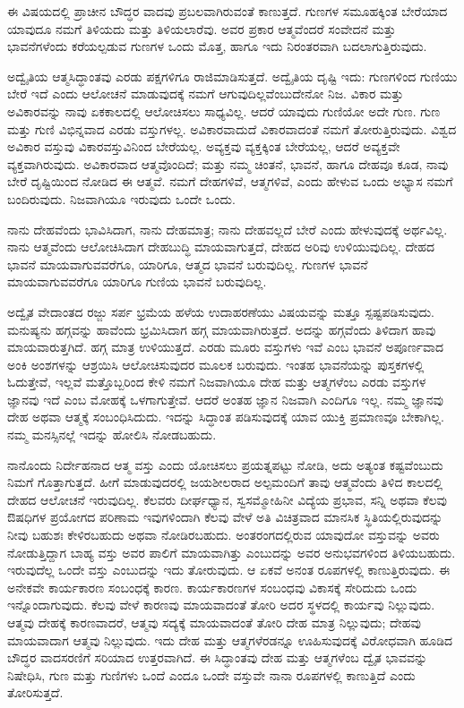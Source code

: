 ಈ ವಿಷಯದಲ್ಲಿ ಪ್ರಾಚೀನ ಬೌದ್ಧರ ವಾದವು ಪ್ರಬಲವಾಗಿರುವಂತೆ ಕಾಣುತ್ತದೆ. ಗುಣಗಳ ಸಮೂಹಕ್ಕಿಂತ ಬೇರೆಯಾದ ಯಾವುದೂ ನಮಗೆ ತಿಳಿಯದು ಮತ್ತು ತಿಳಿಯಲಾರೆವು. ಅವರ ಪ್ರಕಾರ ಆತ್ಮವೆಂದರೆ ಸಂವೇದನೆ ಮತ್ತು ಭಾವನೆಗಳೆಂದು ಕರೆಯಲ್ಪಡುವ ಗುಣಗಳ ಒಂದು ಮೊತ್ತ, ಹಾಗೂ ಇದು ನಿರಂತರವಾಗಿ ಬದಲಾಗುತ್ತಿರುವುದು. 

ಅದ್ವೈತಿಯ ಆತ್ಮಸಿದ್ಧಾಂತವು ಎರಡು ಪಕ್ಷಗಳಿಗೂ ರಾಜಿಮಾಡಿಸುತ್ತದೆ. ಅದ್ವೈತಿಯ ದೃಷ್ಟಿ ಇದು: ಗುಣಗಳಿಂದ ಗುಣಿಯು ಬೇರೆ ಇದೆ ಎಂದು ಆಲೋಚನೆ ಮಾಡುವುದಕ್ಕೆ ನಮಗೆ ಆಗುವುದಿಲ್ಲವೆಂಬುದೇನೋ ನಿಜ. ವಿಕಾರ ಮತ್ತು ಅವಿಕಾರವನ್ನು ನಾವು ಏಕಕಾಲದಲ್ಲಿ ಆಲೋಚಿಸಲು ಸಾಧ್ಯವಿಲ್ಲ. ಆದರೆ ಯಾವುದು ಗುಣಿಯೋ ಅದೇ ಗುಣ. ಗುಣ ಮತ್ತು ಗುಣಿ ವಿಭಿನ್ನವಾದ ಎರಡು ವಸ್ತುಗಳಲ್ಲ. ಅವಿಕಾರವಾದುದೆ ವಿಕಾರವಾದಂತೆ ನಮಗೆ ತೋರುತ್ತಿರುವುದು. ವಿಶ್ವದ ಅವಿಕಾರ ವಸ್ತುವು ವಿಕಾರವಸ್ತುವಿನಿಂದ ಬೇರೆಯಲ್ಲ. ಅವ್ಯಕ್ತವು ವ್ಯಕ್ತಕ್ಕಿಂತ ಬೇರೆಯಲ್ಲ, ಆದರೆ ಅವ್ಯಕ್ತವೇ ವ್ಯಕ್ತವಾಗಿರುವುದು. ಅವಿಕಾರವಾದ ಆತ್ಮವೊಂದಿದೆ; ಮತ್ತು ನಮ್ಮ ಚಿಂತನೆ, ಭಾವನೆ, ಹಾಗೂ ದೇಹವೂ ಕೂಡ, ನಾವು ಬೇರೆ ದೃಷ್ಟಿಯಿಂದ ನೋಡಿದ ಈ ಆತ್ಮವೆ. ನಮಗೆ ದೇಹಗಳಿವೆ, ಆತ್ಮಗಳಿವೆ, ಎಂದು ಹೇಳುವ ಒಂದು ಅಭ್ಯಾಸ ನಮಗೆ ಬಂದಿರುವುದು. ನಿಜವಾಗಿಯೂ ಇರುವುದು ಒಂದೇ ಒಂದು. 

ನಾನು ದೇಹವೆಂದು ಭಾವಿಸಿದಾಗ, ನಾನು ದೇಹಮಾತ್ರ; ನಾನು ದೇಹವಲ್ಲದೆ ಬೇರೆ ಎಂದು ಹೇಳುವುದಕ್ಕೆ ಅರ್ಥವಿಲ್ಲ. ನಾನು ಆತ್ಮವೆಂದು ಆಲೋಚಿಸಿದಾಗ ದೇಹಬುದ್ಧಿ ಮಾಯವಾಗುತ್ತದೆ, ದೇಹದ ಅರಿವು ಉಳಿಯುವುದಿಲ್ಲ. ದೇಹದ ಭಾವನೆ ಮಾಯವಾಗುವವರೆಗೂ, ಯಾರಿಗೂ, ಆತ್ಮದ ಭಾವನೆ ಬರುವುದಿಲ್ಲ. ಗುಣಗಳ ಭಾವನೆ ಮಾಯವಾಗುವವರೆಗೂ ಯಾರಿಗೂ ಗುಣಿಯ ಭಾವನೆ ಬರುವುದಿಲ್ಲ. 

ಅದ್ವೈತ ವೇದಾಂತದ ರಜ್ಜು ಸರ್ಪ ಭ್ರಮೆಯ ಹಳೆಯ ಉದಾಹರಣೆಯು ವಿಷಯವನ್ನು ಮತ್ತೂ ಸ್ಪಷ್ಟಪಡಿಸುವುದು. ಮನುಷ್ಯನು ಹಗ್ಗವನ್ನು ಹಾವೆಂದು ಭ್ರಮಿಸಿದಾಗ ಹಗ್ಗ ಮಾಯವಾಗಿರುತ್ತದೆ. ಅದನ್ನು ಹಗ್ಗವೆಂದು ತಿಳಿದಾಗ ಹಾವು ಮಾಯವಾರುತ್ತಗಿದೆ. ಹಗ್ಗ ಮಾತ್ರ ಉಳಿಯುತ್ತದೆ. ಎರಡು ಮೂರು ವಸ್ತುಗಳು ಇವೆ ಎಂಬ ಭಾವನೆ ಅಪೂರ್ಣವಾದ ಅಂಕಿ ಅಂಶಗಳನ್ನು ಆಶ್ರಯಿಸಿ ಆಲೋಚಿಸುವುದರ ಮೂಲಕ ಬರುವುದು. ಇಂತಹ ಭಾವನೆಯನ್ನು ಪುಸ್ತಕಗಳಲ್ಲಿ ಓದುತ್ತೇವೆ, ಇಲ್ಲವೆ ಮತ್ತೊಬ್ಬರಿಂದ ಕೇಳಿ ನಮಗೆ ನಿಜವಾಗಿಯೂ ದೇಹ ಮತ್ತು ಆತ್ಮಗಳೆಂಬ ಎರಡು ವಸ್ತುಗಳ ಜ್ಞಾನವು ಇದೆ ಎಂಬ ಮೋಹಕ್ಕೆ ಒಳಗಾಗುತ್ತೇವೆ. ಆದರೆ ಅಂತಹ ಜ್ಞಾನ ನಿಜವಾಗಿ ಎಂದಿಗೂ ಇಲ್ಲ. ನಮ್ಮ ಜ್ಞಾನವು ದೇಹ ಅಥವಾ ಆತ್ಮಕ್ಕೆ ಸಂಬಂಧಿಸಿದುದು. ಇದನ್ನು ಸಿದ್ಧಾಂತ ಪಡಿಸುವುದಕ್ಕೆ ಯಾವ ಯುಕ್ತಿ ಪ್ರಮಾಣವೂ ಬೇಕಾಗಿಲ್ಲ. ನಮ್ಮ ಮನಸ್ಸಿನಲ್ಲೆ ಇದನ್ನು ಹೋಲಿಸಿ ನೋಡಬಹುದು. 

ನಾನೊಂದು ನಿರ್ದೇಹನಾದ ಆತ್ಮ ವಸ್ತು ಎಂದು ಯೋಚಿಸಲು ಪ್ರಯತ್ನಪಟ್ಟು ನೋಡಿ, ಅದು ಅತ್ಯಂತ ಕಷ್ಟವೆಂಬುದು ನಿಮಗೆ ಗೊತ್ತಾಗುತ್ತದೆ. ಹೀಗೆ ಮಾಡುವುದರಲ್ಲಿ ಜಯಶೀಲರಾದ ಅಲ್ಪಮಂದಿಗೆ ತಾವು ಆತ್ಮವೆಂದು ತಿಳಿದ ಕಾಲದಲ್ಲಿ ದೇಹದ ಆಲೋಚನೆ ಇರುವುದಿಲ್ಲ. ಕೆಲವರು ದೀರ್ಘಧ್ಯಾನ, ಸ್ವಸಮ್ಮೋಹಿನೀ ವಿದ್ಯೆಯ ಪ್ರಭಾವ, ಸನ್ನಿ ಅಥವಾ ಕೆಲವು ಔಷಧಿಗಳ ಪ್ರಯೋಗದ ಪರಿಣಾಮ ಇವುಗಳಿಂದಾಗಿ ಕೆಲವು ವೇಳೆ ಅತಿ ವಿಚಿತ್ರವಾದ ಮಾನಸಿಕ ಸ್ಥಿತಿಯಲ್ಲಿರುವುದನ್ನು ನೀವು ಬಹುಶಃ ಕೇಳಿರಬಹುದು ಅಥವಾ ನೋಡಿರಬಹುದು. ಅಂತರಂಗದಲ್ಲಿರುವ ಯಾವುದೋ ವಸ್ತುವನ್ನು ಅವರು ನೋಡುತ್ತಿದ್ದಾಗ ಬಾಹ್ಯ ವಸ್ತು ಅವರ ಪಾಲಿಗೆ ಮಾಯವಾಗಿತ್ತು ಎಂಬುದನ್ನು ಅವರ ಅನುಭವಗಳಿಂದ ತಿಳಿಯಬಹುದು. ಇರುವುದೆಲ್ಲ ಒಂದೇ ವಸ್ತು ಎಂಬುದನ್ನು ಇದು ತೋರುವುದು. ಆ ಏಕವೆ ಅನಂತ ರೂಪಗಳಲ್ಲಿ ಕಾಣುತ್ತಿರುವುದು. ಈ ಅನೇಕವೇ ಕಾರ್ಯಕಾರಣ ಸಂಬಂಧಕ್ಕೆ ಕಾರಣ. ಕಾರ್ಯಕಾರಣಗಳ ಸಂಬಂಧವು ವಿಕಾಸಕ್ಕೆ ಸೇರಿದುದು ಒಂದು ಇನ್ನೊಂದಾಗುವುದು. ಕೆಲವು ವೇಳೆ ಕಾರಣವು ಮಾಯವಾದಂತೆ ತೋರಿ ಅದರ ಸ್ಥಳದಲ್ಲಿ ಕಾರ್ಯವು ನಿಲ್ಲುವುದು. ಆತ್ಮವು ದೇಹಕ್ಕೆ ಕಾರಣವಾದರೆ, ಆತ್ಮವು ಸದ್ಯಕ್ಕೆ ಮಾಯವಾದಂತೆ ತೋರಿ ದೇಹ ಮಾತ್ರ ನಿಲ್ಲುವುದು; ದೇಹವು ಮಾಯವಾದಾಗ ಆತ್ಮವು ನಿಲ್ಲುವುದು. ಇದು ದೇಹ ಮತ್ತು ಆತ್ಮಗಳೆರಡನ್ನೂ ಊಹಿಸುವುದಕ್ಕೆ ವಿರೋಧವಾಗಿ ಹೂಡಿದ ಬೌದ್ಧರ ವಾದಸರಣಿಗೆ ಸರಿಯಾದ ಉತ್ತರವಾಗಿದೆ. ಈ ಸಿದ್ಧಾಂತವು ದೇಹ ಮತ್ತು ಆತ್ಮಗಳೆಂಬ ದ್ವೈತ ಭಾವವನ್ನು ನಿಷೇಧಿಸಿ, ಗುಣ ಮತ್ತು ಗುಣಿಗಳು ಒಂದೆ ಎಂದೂ ಒಂದೇ ವಸ್ತುವೇ ನಾನಾ ರೂಪಗಳಲ್ಲಿ ಕಾಣುತ್ತಿದೆ ಎಂದು ತೋರಿಸುತ್ತದೆ. 


